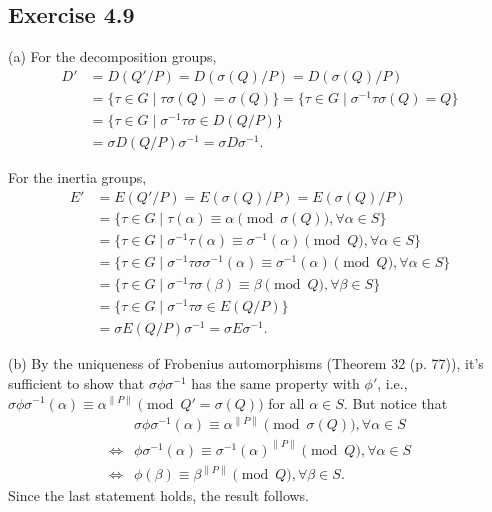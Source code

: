 \documentclass[../Marcus.tex]{subfiles}
\begin{document}
\subsection*{Exercise 4.9}

(a) For the decomposition groups,
\begin{align*}
    D' &= D(Q'/P) = D(\sigma(Q)/P) = D(\sigma(Q)/P) \\
	&= \{\tau\in G\mid \tau\sigma(Q)=\sigma(Q)\} = \{\tau\in G\mid \sigma^{-1}\tau\sigma(Q)=Q\} \\
    &= \{\tau\in G\mid \sigma^{-1}\tau\sigma \in D(Q/P)\}   \\
	&= \sigma D(Q/P) \sigma^{-1} = \sigma D\sigma^{-1}.
\end{align*}

For the inertia groups,
\begin{align*}
    E' &= E(Q'/P) = E(\sigma(Q)/P) = E(\sigma(Q)/P) \\
	&= \{\tau\in G \mid \tau(\alpha) \equiv \alpha \pmod{\sigma(Q)}, \forall\alpha\in S\} \\
	&= \{\tau\in G \mid \sigma^{-1}\tau(\alpha) \equiv \sigma^{-1}(\alpha) \pmod{Q}, \forall\alpha\in S\} \\
    &= \{\tau\in G \mid \sigma^{-1}\tau\sigma\sigma^{-1}(\alpha) \equiv \sigma^{-1}(\alpha) \pmod{Q}, \forall\alpha\in S\} \\
    &= \{\tau\in G\mid \sigma^{-1}\tau\sigma(\beta) \equiv \beta \pmod{Q}, \forall\beta\in S\} \\
    &= \{\tau\in G\mid \sigma^{-1}\tau\sigma\in E(Q/P)\} \\
    &= \sigma E(Q/P)\sigma^{-1} = \sigma E\sigma^{-1}.
\end{align*}

(b) By the uniqueness of Frobenius automorphisms (Theorem 32 (p. 77)), it's sufficient to show that $\sigma\phi\sigma^{-1}$ has the same property with $\phi'$, i.e., $\sigma\phi\sigma^{-1}(\alpha)\equiv\alpha^{\|P\|} \pmod{Q'=\sigma(Q)}$ for all $\alpha\in S$. But notice that
\begin{align*}
    &\sigma\phi\sigma^{-1}(\alpha)\equiv\alpha^{\|P\|} \pmod{\sigma(Q)}, \forall\alpha\in S \\
    \iff{} &\phi\sigma^{-1}(\alpha) \equiv \sigma^{-1}(\alpha)^{\|P\|} \pmod{Q}, \forall\alpha\in S \\
    \iff{} &\phi(\beta) \equiv \beta^{\|P\|} \pmod{Q}, \forall\beta\in S.
\end{align*}
Since the last statement holds, the result follows.
\end{document}
